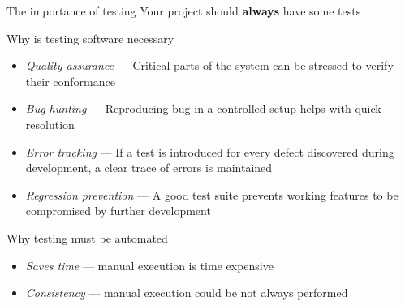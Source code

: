 \documentclass[presentation]{beamer}
\begin{document}
\begin{frame}[fragile]{The importance of testing}
    Your project should \textbf{always} have some tests
    \begin{block}{Why is testing software necessary}
        \begin{itemize}
            \item \textit{Quality assurance} --- Critical parts of the system can be stressed to verify their conformance
            \item \textit{Bug hunting} --- Reproducing bug in a controlled setup helps with quick resolution
            \item \textit{Error tracking} --- If a test is introduced for every defect discovered during development, a clear trace of errors is maintained
            \item \textit{Regression prevention} --- A good test suite prevents working features to be compromised by further development
        \end{itemize}
    \end{block}
    \begin{block}{Why testing must be automated}
        \begin{itemize}
            \item \textit{Saves time} --- manual execution is time expensive
            \item \textit{Consistency} --- manual execution could be not always performed
        \end{itemize}
    \end{block}
\end{frame}
\end{document}
